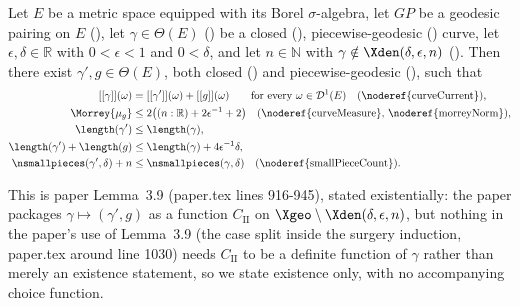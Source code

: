 \begin{lemma}
  \label{cut_II}
  Let $E$ be a metric space equipped with its Borel $\sigma$-algebra, let $GP$ be a geodesic
  pairing on $E$ (), let $\gamma \in \Theta(E)$ () be a
  closed (), piecewise-geodesic () curve, let
  $\epsilon,\delta \in \mathbb{R}$ with $0 < \epsilon < 1$ and $0 < \delta$, and let $n \in
  \mathbb{N}$ with $\gamma \notin \Xden(\delta,\epsilon,n)$ (). Then there
  exist $\gamma',g \in \Theta(E)$, both closed () and piecewise-geodesic
  (), such that
  \begin{align}
    \label{eq:SameSumTypeII}
    [[\gamma]](\omega) &= [[\gamma']](\omega) + [[g]](\omega) \qquad \text{for every } \omega \in
    \mathcal{D}^1(E)
    \quad\text{(\noderef{curveCurrent})}, \\
    \label{eq:MorreyTypeII}
    \Morrey{\mu_g} &\le 2\bigl((n:\mathbb{R})+2\epsilon^{-1}+2\bigr) \quad\text{(\noderef{curveMeasure},
    \noderef{morreyNorm})}, \\
    \label{eq:LengthBoundTypeIIgamma}
    \length(\gamma') &\le \length(\gamma) , \\
    \label{eq:LengthBoundTypeIItotal}
    \length(\gamma') + \length(g) &\le \length(\gamma) + 4\epsilon^{-1}\delta , \\
    \label{eq:SmallCountBoundTypeII}
    \nsmallpieces(\gamma',\delta) + n &\le \nsmallpieces(\gamma,\delta) \quad\text{(\noderef{smallPieceCount})}
    .
  \end{align}

  This is paper Lemma~3.9 (paper.tex lines 916-945), stated existentially: the paper packages
  $\gamma \mapsto (\gamma',g)$ as a function $C_{\mathrm{II}}$ on $\Xgeo\setminus\Xden(\delta,
  \epsilon,n)$, but nothing in the paper's use of Lemma~3.9 (the case split inside the surgery
  induction, paper.tex around line 1030) needs $C_{\mathrm{II}}$ to be a definite function of
  $\gamma$ rather than merely an existence statement, so we state existence only, with no
  accompanying choice function.


\end{lemma}
